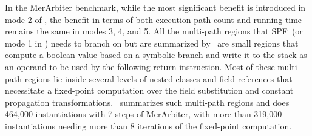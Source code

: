 In the MerArbiter benchmark, while the most significant benefit is introduced in mode 2 of \tool, the benefit in terms of
both execution path count and running time remains the same in modes 3, 4, and 5.
%
All the multi-path regions that SPF~(or mode 1 in \tool) needs to branch on but are summarized by \tool\ are small
regions that compute a boolean value based on a symbolic branch and write it to the stack as an operand to be used
by the following return instruction.
%
Most of these multi-path regions lie inside several levels of nested classes and field references that necessitate
a fixed-point computation over the field substitution and constant propagation transformations.
%
\tool\ summarizes such multi-path regions and does 464,000 instantiations with 7 steps of MerArbiter, with more than
319,000 instantiations needing more than 8 iterations of the fixed-point computation.